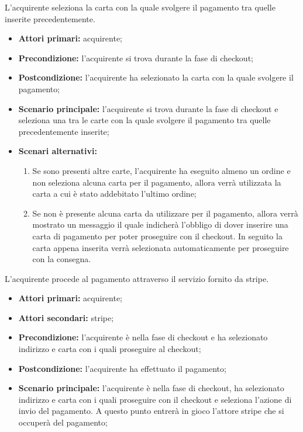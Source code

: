 L'acquirente seleziona la carta con la quale svolgere il pagamento tra quelle inserite precedentemente.
\begin{itemize}
    \item \textbf{Attori primari:} acquirente;
    \item \textbf{Precondizione:} l'acquirente si trova durante la fase di checkout;
    \item \textbf{Postcondizione:} l'acquirente ha selezionato la carta con la quale svolgere il pagamento;
    \item \textbf{Scenario principale:} l'acquirente si trova durante la fase di checkout e seleziona una tra le carte con la quale svolgere il pagamento tra quelle precedentemente inserite;
    \item \textbf{Scenari alternativi:}
    \begin{enumerate}[label=\lett]
        \item Se sono presenti altre carte, l'acquirente ha eseguito almeno un ordine e non seleziona alcuna carta per il pagamento, allora verrà utilizzata la carta a cui è stato addebitato l'ultimo ordine;
        \item Se non è presente alcuna carta da utilizzare per il pagamento, allora verrà mostrato un messaggio il quale indicherà l'obbligo di dover inserire una carta di pagamento per poter proseguire con il checkout. In seguito la carta appena inserita verrà selezionata automaticamente per proseguire con la consegna.
    \end{enumerate}
\end{itemize}

L'acquirente procede al pagamento attraverso il servizio fornito da stripe.
\begin{itemize}
    \item \textbf{Attori primari:} acquirente;
    \item \textbf{Attori secondari:} stripe;
    \item \textbf{Precondizione:} l'acquirente è nella fase di checkout e ha selezionato indirizzo e carta con i quali proseguire al checkout;
    \item \textbf{Postcondizione:} l'acquirente ha effettuato il pagamento;
    \item \textbf{Scenario principale:} l'acquirente è nella fase di checkout, ha selezionato indirizzo e carta con i quali proseguire con il checkout e seleziona l'azione di invio del pagamento. A questo punto entrerà in gioco l'attore stripe che si occuperà del pagamento;
\end{itemize}

